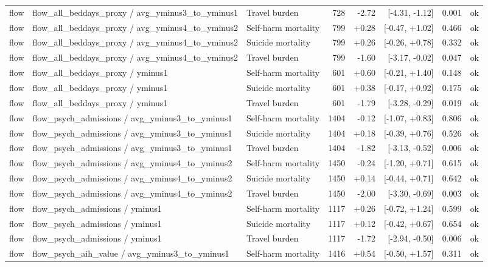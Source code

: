 \begin{table}[!htbp]
{\begin{tabular}{lllrrrrl}
flow & flow\_all\_beddays\_proxy / avg\_yminus3\_to\_yminus1 & Travel burden & 728 & -2.72 & [-4.31, -1.12] & 0.001 & ok \\
flow & flow\_all\_beddays\_proxy / avg\_yminus4\_to\_yminus2 & Self-harm mortality & 799 & +0.28 & [-0.47, +1.02] & 0.466 & ok \\
flow & flow\_all\_beddays\_proxy / avg\_yminus4\_to\_yminus2 & Suicide mortality & 799 & +0.26 & [-0.26, +0.78] & 0.332 & ok \\
flow & flow\_all\_beddays\_proxy / avg\_yminus4\_to\_yminus2 & Travel burden & 799 & -1.60 & [-3.17, -0.02] & 0.047 & ok \\
flow & flow\_all\_beddays\_proxy / yminus1 & Self-harm mortality & 601 & +0.60 & [-0.21, +1.40] & 0.148 & ok \\
flow & flow\_all\_beddays\_proxy / yminus1 & Suicide mortality & 601 & +0.38 & [-0.17, +0.92] & 0.175 & ok \\
flow & flow\_all\_beddays\_proxy / yminus1 & Travel burden & 601 & -1.79 & [-3.28, -0.29] & 0.019 & ok \\
flow & flow\_psych\_admissions / avg\_yminus3\_to\_yminus1 & Self-harm mortality & 1404 & -0.12 & [-1.07, +0.83] & 0.806 & ok \\
flow & flow\_psych\_admissions / avg\_yminus3\_to\_yminus1 & Suicide mortality & 1404 & +0.18 & [-0.39, +0.76] & 0.526 & ok \\
flow & flow\_psych\_admissions / avg\_yminus3\_to\_yminus1 & Travel burden & 1404 & -1.82 & [-3.13, -0.52] & 0.006 & ok \\
flow & flow\_psych\_admissions / avg\_yminus4\_to\_yminus2 & Self-harm mortality & 1450 & -0.24 & [-1.20, +0.71] & 0.615 & ok \\
flow & flow\_psych\_admissions / avg\_yminus4\_to\_yminus2 & Suicide mortality & 1450 & +0.14 & [-0.44, +0.71] & 0.642 & ok \\
flow & flow\_psych\_admissions / avg\_yminus4\_to\_yminus2 & Travel burden & 1450 & -2.00 & [-3.30, -0.69] & 0.003 & ok \\
flow & flow\_psych\_admissions / yminus1 & Self-harm mortality & 1117 & +0.26 & [-0.72, +1.24] & 0.599 & ok \\
flow & flow\_psych\_admissions / yminus1 & Suicide mortality & 1117 & +0.12 & [-0.42, +0.67] & 0.654 & ok \\
flow & flow\_psych\_admissions / yminus1 & Travel burden & 1117 & -1.72 & [-2.94, -0.50] & 0.006 & ok \\
flow & flow\_psych\_aih\_value / avg\_yminus3\_to\_yminus1 & Self-harm mortality & 1416 & +0.54 & [-0.50, +1.57] & 0.311 & ok \\

\end{tabular}}
\end{table}
